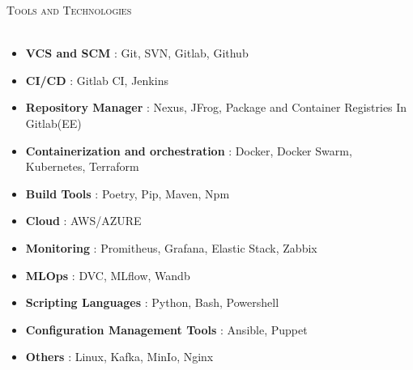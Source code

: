 \documentclass[a4paper]{article}
\newcommand{\lineunder} {
    \vspace*{-8pt} \\
    \hspace*{-18pt} \hrulefill \\
}
\newcommand{\header} [1] {
    {\hspace*{-18pt}\vspace*{6pt} \textsc{#1}}
    \vspace*{-6pt} \lineunder
}
\begin{document}

\header{Tools and Technologies}
\begin{itemize}
    \item \textbf{VCS and SCM} : Git, SVN, Gitlab, Github
    \item \textbf{CI/CD} : Gitlab CI, Jenkins 
    \item \textbf{Repository Manager} : Nexus, JFrog, Package and Container Registries In Gitlab(EE)
    \item \textbf{Containerization and orchestration} : Docker, Docker Swarm, Kubernetes, Terraform
    \item \textbf{Build Tools} : Poetry, Pip, Maven, Npm
    \item \textbf{Cloud} : AWS/AZURE
    \item \textbf{Monitoring} : Promitheus, Grafana, Elastic Stack, Zabbix 
    \item \textbf{MLOps} : DVC, MLflow, Wandb
    \item \textbf{Scripting Languages} : Python, Bash, Powershell
    \item \textbf{Configuration Management Tools} : Ansible, Puppet
    \item \textbf{Others} : Linux, Kafka, MinIo, Nginx
\end{itemize}

\vspace{2mm}

\
\end{document}
